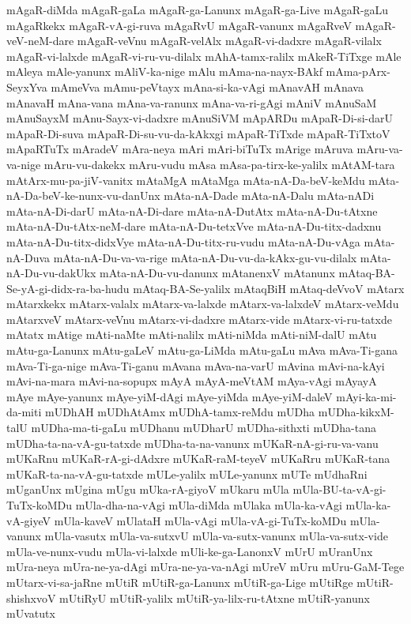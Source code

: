 {mAgaR-diMda
mAgaR-gaLa
mAgaR-ga-Lanunx
mAgaR-ga-Live
mAgaR-gaLu
mAgaRkekx
mAgaR-vA-gi-ruva
mAgaRvU
mAgaR-vanunx
mAgaRveV
mAgaR-veV-neM-dare
mAgaR-veVnu
mAgaR-velAlx
mAgaR-vi-dadxre
mAgaR-vilalx
mAgaR-vi-lalxde
mAgaR-vi-ru-vu-dilalx
mAhA-tamx-ralilx
mAkeR-TiTxge
mAle
mAleya
mAle-yanunx
mAliV-ka-nige
mAlu
mAma-na-nayx-BAkf
mAma-pArx-SeyxYva
mAmeVva
mAmu-peVtayx
mAna-si-ka-vAgi
mAnavAH
mAnava
mAnavaH
mAna-vana
mAna-va-ranunx
mAna-va-ri-gAgi
mAniV
mAnuSaM
mAnuSayxM
mAnu-Sayx-vi-dadxre
mAnuSiVM
mApARDu
mApaR-Di-si-darU
mApaR-Di-suva
mApaR-Di-su-vu-da-kAkxgi
mApaR-TiTxde
mApaR-TiTxtoV
mApaRTuTx
mAradeV
mAra-neya
mAri
mAri-biTuTx
mArige
mAruva
mAru-va-va-nige
mAru-vu-dakekx
mAru-vudu
mAsa
mAsa-pa-tirx-ke-yalilx
mAtAM-tara
mAtArx-mu-pa-jiV-vanitx
mAtaMgA
mAtaMga
mAta-nA-Da-beV-keMdu
mAta-nA-Da-beV-ke-nunx-vu-danUnx
mAta-nA-Dade
mAta-nA-Dalu
mAta-nADi
mAta-nA-Di-darU
mAta-nA-Di-dare
mAta-nA-DutAtx
mAta-nA-Du-tAtxne
mAta-nA-Du-tAtx-neM-dare
mAta-nA-Du-tetxVve
mAta-nA-Du-titx-dadxnu
mAta-nA-Du-titx-didxVye
mAta-nA-Du-titx-ru-vudu
mAta-nA-Du-vAga
mAta-nA-Duva
mAta-nA-Du-va-va-rige
mAta-nA-Du-vu-da-kAkx-gu-vu-dilalx
mAta-nA-Du-vu-dakUkx
mAta-nA-Du-vu-danunx
mAtanenxV
mAtanunx
mAtaq-BA-Se-yA-gi-didx-ra-ba-hudu
mAtaq-BA-Se-yalilx
mAtaqBiH
mAtaq-deVvoV
mAtarx
mAtarxkekx
mAtarx-valalx
mAtarx-va-lalxde
mAtarx-va-lalxdeV
mAtarx-veMdu
mAtarxveV
mAtarx-veVnu
mAtarx-vi-dadxre
mAtarx-vide
mAtarx-vi-ru-tatxde
mAtatx
mAtige
mAti-naMte
mAti-nalilx
mAti-niMda
mAti-niM-dalU
mAtu
mAtu-ga-Lanunx
mAtu-gaLeV
mAtu-ga-LiMda
mAtu-gaLu
mAva
mAva-Ti-gana
mAva-Ti-ga-nige
mAva-Ti-ganu
mAvana
mAva-na-varU
mAvina
mAvi-na-kAyi
mAvi-na-mara
mAvi-na-sopupx
mAyA
mAyA-meVtAM
mAya-vAgi
mAyayA
mAye
mAye-yanunx
mAye-yiM-dAgi
mAye-yiMda
mAye-yiM-daleV
mAyi-ka-mi-da-miti
mUDhAH
mUDhAtAmx
mUDhA-tamx-reMdu
mUDha
mUDha-kikxM-talU
mUDha-ma-ti-gaLu
mUDhanu
mUDharU
mUDha-sithxti
mUDha-tana
mUDha-ta-na-vA-gu-tatxde
mUDha-ta-na-vanunx
mUKaR-nA-gi-ru-va-vanu
mUKaRnu
mUKaR-rA-gi-dAdxre
mUKaR-raM-teyeV
mUKaRru
mUKaR-tana
mUKaR-ta-na-vA-gu-tatxde
mULe-yalilx
mULe-yanunx
mUTe
mUdhaRni
mUganUnx
mUgina
mUgu
mUka-rA-giyoV
mUkaru
mUla
mUla-BU-ta-vA-gi-TuTx-koMDu
mUla-dha-na-vAgi
mUla-diMda
mUlaka
mUla-ka-vAgi
mUla-ka-vA-giyeV
mUla-kaveV
mUlataH
mUla-vAgi
mUla-vA-gi-TuTx-koMDu
mUla-vanunx
mUla-vasutx
mUla-va-sutxvU
mUla-va-sutx-vanunx
mUla-va-sutx-vide
mUla-ve-nunx-vudu
mUla-vi-lalxde
mUli-ke-ga-LanonxV
mUrU
mUranUnx
mUra-neya
mUra-ne-ya-dAgi
mUra-ne-ya-va-nAgi
mUreV
mUru
mUru-GaM-Tege
mUtarx-vi-sa-jaRne
mUtiR
mUtiR-ga-Lanunx
mUtiR-ga-Lige
mUtiRge
mUtiR-shishxvoV
mUtiRyU
mUtiR-yalilx
mUtiR-ya-lilx-ru-tAtxne
mUtiR-yanunx
mUvatutx
}
